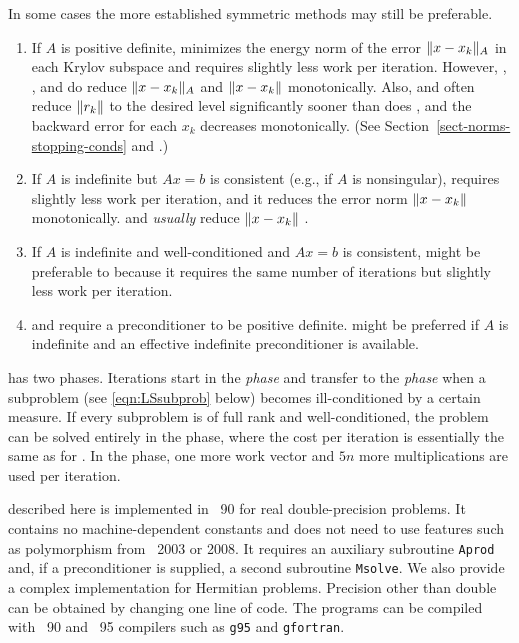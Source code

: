 \documentclass{doc_acmtrans2m}
\begin{document}
In some cases the more established symmetric methods may still be
preferable.

\begin{enumerate}  
\item If $A$ is positive definite, \CG minimizes the energy norm of
  the error \hbox{$\norm{x-x_k}_A$} in each Krylov subspace and
  requires slightly less work per iteration.  However, \CG, \MINRES,
  and \MINRESQLP do reduce $\norm{x-x_k}_A$ and $\norm{x-x_k}$
  monotonically.  Also, \MINRES and \MINRESQLP often reduce
  $\norm{r_k}$ to the desired level significantly sooner than does
  \CG, and the backward error for each $x_k$ decreases monotonically.
  (See Section~\ref{sect-norms-stopping-conds} and
  \cite{Fong2011,FS12}.)

\item If $A$ is indefinite but $Ax = b$ is consistent (e.g., if $A$ is
  nonsingular), \SYMMLQ requires slightly less work per iteration, and
  it reduces the error norm $\norm{x-x_k}$ monotonically.  \MINRES and
  \MINRESQLP \emph{usually} reduce $\norm{x-x_k}$
  \cite{Fong2011,FS12}.

\item If $A$ is indefinite and well-conditioned and $A x = b$ is
  consistent, \MINRES might be preferable to \MINRESQLP because it
  requires the same number of iterations but slightly less work per
  iteration.

\item \MINRES and \MINRESQLP require a preconditioner to be positive
  definite.  \SQMR might be preferred if $A$ is indefinite and an
  effective indefinite preconditioner is available.
\end{enumerate}

\MINRESQLP has two phases.  Iterations start in the \emph{\MINRES
  phase} and transfer to the \emph{\MINRESQLP phase} when a subproblem
(see \eqref{eqn:LSsubprob} below) becomes ill-conditioned by a certain
measure.  If every subproblem is of full rank and well-conditioned,
the problem can be solved entirely in the \MINRES phase, where the
cost per iteration is essentially the same as for \MINRES.  In the
\MINRESQLP phase, one more work vector and $5n$ more multiplications
are used per iteration.


\MINRESQLP described here is implemented in \FORTRAN~90 for real
double-precision problems.  It contains no machine-dependent constants
and does not need to use features such as polymorphism from
\FORTRAN~2003 or 2008. It requires an auxiliary subroutine
\texttt{Aprod} and, if a preconditioner is supplied, a second
subroutine \texttt{Msolve}.
We also provide a complex implementation for Hermitian problems.
Precision other than double can be obtained by changing one line of code.
The programs can be compiled with \FORTRAN~90 and \FORTRAN~95 compilers
such as \texttt{g95} and \texttt{gfortran}.
\end{document}
